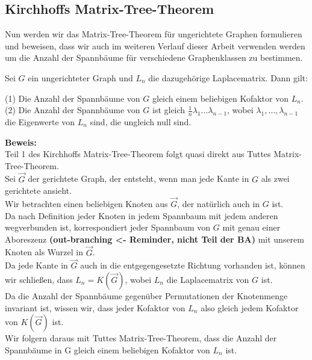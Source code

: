 \subsection{Kirchhoffs Matrix-Tree-Theorem}
Nun werden wir das Matrix-Tree-Theorem für ungerichtete Graphen formulieren und beweisen, dass wir auch im weiteren Verlauf dieser Arbeit verwenden werden um die Anzahl der Spannbäume für verschiedene Graphenklassen zu bestimmen.
\begin{Tms}
Sei $G$ ein ungerichteter Graph und $L_n$  die dazugehörige Laplacematrix. 
Dann gilt:
\par
\begingroup
\leftskip=20pt%
\rightskip=20pt
\noindent %
(1) Die Anzahl der Spannbäume von $G$ gleich einem beliebigen Kofaktor von $L_n$.\\
(2) Die Anzahl der Spannbäume von $G$ ist gleich $\frac{1}{n}\lambda_1\ldots\lambda_{n-1}$, wobei $\lambda_1,\ldots,\lambda_{n-1}$ die Eigenwerte von $L_n$ sind, die ungleich null sind.
\par
\endgroup
\end{Tms}
\textbf{Beweis:}\\
Teil 1 des Kirchhoffs Matrix-Tree-Theorem folgt quasi direkt aus Tuttes Matrix-Tree-Theorem. \\
Sei $\vec{G}$ der gerichtete Graph, der entsteht, wenn man jede Kante in $G$ als zwei gerichtete ansieht.\\
Wir betrachten einen beliebigen Knoten aus $\vec{G}$, der natürlich auch in $G$ ist. \\
Da nach Definition jeder Knoten in jedem Spannbaum mit jedem anderen wegverbunden ist, korrespondiert jeder Spannbaum von $G$ mit genau einer Aboreszenz \textbf{(out-branching <- Reminder, nicht Teil der BA)} mit unserem Knoten als Wurzel in $\vec{G}$. \\
Da jede Kante in $\vec{G}$ auch in die entgegengesetzte Richtung vorhanden ist, können wir schließen, dass $L_n=K(\vec{G})$, wobei $L_n$ die Laplacematrix von $G$ ist. \\
Da die Anzahl der Spannbäume gegenüber Permutationen der Knotenmenge invariant ist, wissen wir, dass jeder Kofaktor von $L_n$ also gleich jedem Kofaktor von $K(\vec{G})$ ist.\\
Wir folgern daraus mit Tuttes Matrix-Tree-Theorem, dass die Anzahl der Spannbäume in G gleich einem beliebigen Kofaktor von $L_n$ ist.\\ \\
